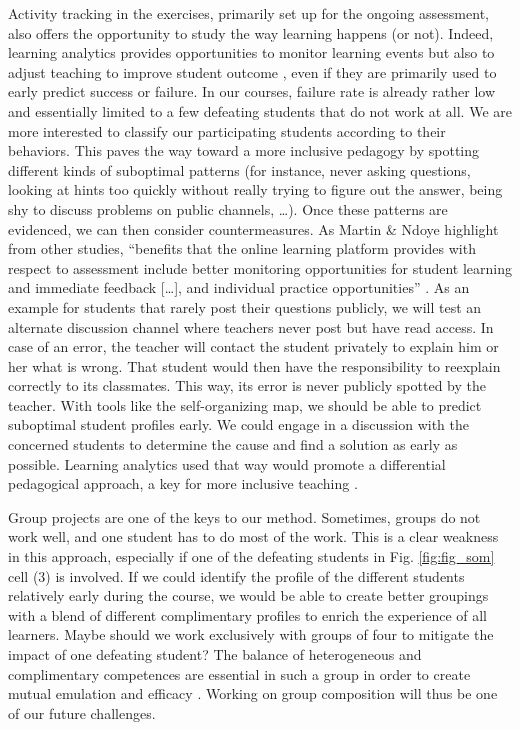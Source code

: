 \documentclass{aims}
\theoremstyle{definition}
\begin{document}
Activity tracking in the exercises, primarily set up for the ongoing
assessment, also offers the opportunity to study the way learning
happens (or not). Indeed, learning analytics provides opportunities to
monitor learning events but also to adjust teaching to improve student
outcome \cite{Martin2016, Romero2020}, even if they are primarily used
to early predict success or failure. In our courses, failure rate is
already rather low and essentially limited to a few defeating students
that do not work at all. We are more interested to classify our
participating students according to their behaviors. This paves the way
toward a more inclusive pedagogy by spotting different kinds of
suboptimal patterns (for instance, never asking questions, looking at
hints too quickly without really trying to figure out the answer, being
shy to discuss problems on public channels, \ldots). Once these patterns
are evidenced, we can then consider countermeasures. As Martin \& Ndoye
highlight from other studies, ``benefits that the online learning
platform provides with respect to assessment include better monitoring
opportunities for student learning and immediate feedback {[}\ldots{]},
and individual practice opportunities'' \cite{Martin2016}. As an example
for students that rarely post their questions publicly, we will test an
alternate discussion channel where teachers never post but have read
access. In case of an error, the teacher will contact the student
privately to explain him or her what is wrong. That student would then
have the responsibility to reexplain correctly to its classmates. This
way, its error is never publicly spotted by the teacher. With tools like
the self-organizing map, we should be able to predict suboptimal student
profiles early. We could engage in a discussion with the concerned
students to determine the cause and find a solution as early as
possible. Learning analytics used that way would promote a differential
pedagogical approach, a key for more inclusive teaching
\cite{Siemens2013}.

Group projects are one of the keys to our method. Sometimes, groups do
not work well, and one student has to do most of the work. This is a
clear weakness in this approach, especially if one of the defeating
students in Fig. \ref {fig:fig_som} cell (3) is involved. If we could
identify the profile of the different students relatively early during
the course, we would be able to create better groupings with a blend of
different complimentary profiles to enrich the experience of all
learners. Maybe should we work exclusively with groups of four to
mitigate the impact of one defeating student? The balance of
heterogeneous and complimentary competences are essential in such a
group in order to create mutual emulation and efficacy
\cite{Mucchielli1996}. Working on group composition will thus be one of
our future challenges.
\end{document}
